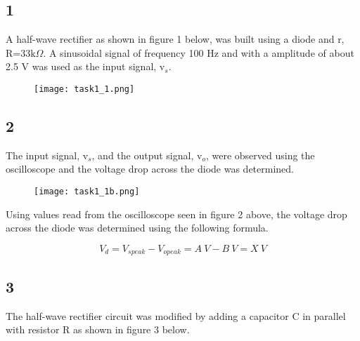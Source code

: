 \subsection*{1}

    A half-wave rectifier as shown in figure 1 below, was built using a  diode and r, R=33k$\Omega$.
    A sinusoidal signal of frequency 100 Hz and with a amplitude of about 2.5 V was used as the input signal, v$_s$.\\

    \begin{figure}[h!]
        \centering
        \texttt{[image: task1\_1.png]}
    \end{figure}

\subsection*{2}

    The input signal, v$_s$, and the output signal, v$_o$, were observed using the oscilloscope and the voltage drop across the diode was determined.\\

    \begin{figure}[h!]
        \centering
        \texttt{[image: task1\_1b.png]}
    \end{figure}

    Using values read from the oscilloscope seen in figure 2 above, the voltage drop across the diode was determined using the following formula.

    $$V_d = V_{s peak} - V_{o peak} = A\ V - B\ V = X\ V$$

\subsection*{3}

    The half-wave rectifier circuit was modified by adding a capacitor C in parallel with resistor R as shown in figure 3 below.


